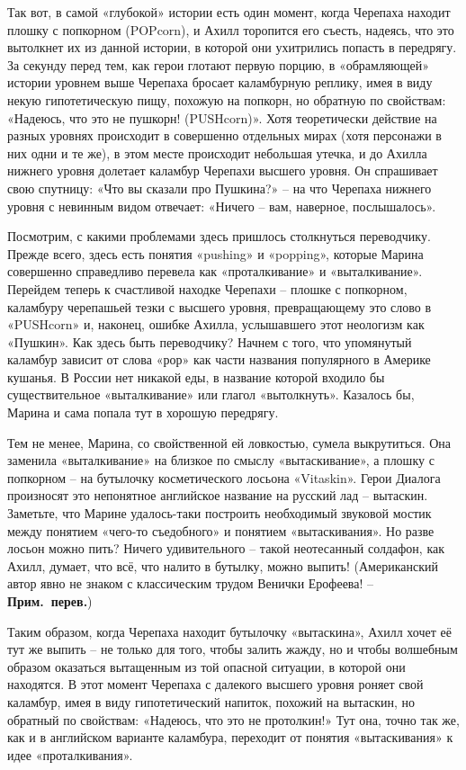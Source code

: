 \documentclass[../main.tex]{subfiles}
\begin{document}
Так вот, в самой «глубокой» истории есть один момент, когда Черепаха находит плошку с попкорном (POPcorn), и Ахилл торопится его съесть, надеясь, что это вытолкнет их из данной истории, в которой они ухитрились попасть в передрягу. За секунду перед тем, как герои глотают первую порцию, в «обрамляющей» истории уровнем выше Черепаха бросает каламбурную реплику, имея в виду некую гипотетическую пищу, похожую на попкорн, но обратную по свойствам: «Надеюсь, что это не пушкорн! (PUSHcorn)». Хотя теоретически действие на разных уровнях происходит в совершенно отдельных мирах (хотя персонажи в них одни и те же), в этом месте происходит небольшая утечка, и до Ахилла нижнего уровня долетает каламбур Черепахи высшего уровня. Он спрашивает свою спутницу: «Что вы сказали про Пушкина?» \--- на что Черепаха нижнего уровня с невинным видом отвечает: «Ничего \--- вам, наверное, послышалось».

Посмотрим, с какими проблемами здесь пришлось столкнуться переводчику. Прежде всего, здесь есть понятия «pushing» и «popping», которые Марина совершенно справедливо перевела как «проталкивание» и «выталкивание». Перейдем теперь к счастливой находке Черепахи \--- плошке с попкорном, каламбуру черепашьей тезки с высшего уровня, превращающему это слово в «PUSHcorn» и, наконец, ошибке Ахилла, услышавшего этот неологизм как «Пушкин». Как здесь быть переводчику? Начнем с того, что упомянутый каламбур зависит от слова «рор» как части названия популярного в Америке кушанья. В России нет никакой еды, в название которой входило бы существительное «выталкивание» или глагол «вытолкнуть». Казалось бы, Марина и сама попала тут в хорошую передрягу.

Тем не менее, Марина, со свойственной ей ловкостью, сумела выкрутиться. Она заменила «выталкивание» на близкое по смыслу «вытаскивание», а плошку с попкорном \--- на бутылочку косметического лосьона «Vitaskin». Герои Диалога произносят это непонятное английское название на русский лад \--- вытаскин. Заметьте, что Марине удалось-таки построить необходимый звуковой мостик между понятием «чего-то съедобного» и понятием «вытаскивания». Но разве лосьон можно пить? Ничего удивительного \--- такой неотесанный солдафон, как Ахилл, думает, что всё, что налито в бутылку, можно выпить! (Американский автор явно не знаком с классическим трудом Венички Ерофеева! \--- \textbf{Прим.\ перев.})

Таким образом, когда Черепаха находит бутылочку «вытаскина», Ахилл хочет её тут же выпить \--- не только для того, чтобы залить жажду, но и чтобы волшебным образом оказаться вытащенным из той опасной ситуации, в которой они находятся. В этот момент Черепаха с далекого высшего уровня роняет свой каламбур, имея в виду гипотетический напиток, похожий на вытаскин, но обратный по свойствам: «Надеюсь, что это не протолкин!» Тут она, точно так же, как и в английском варианте каламбура, переходит от понятия «вытаскивания» к идее «проталкивания».
\end{document}
